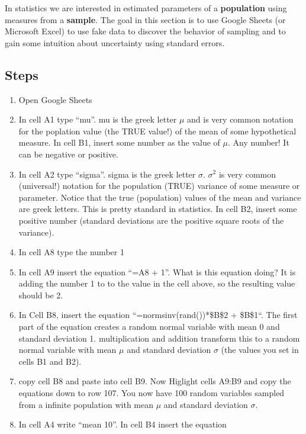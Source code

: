 \documentclass[]{book}
\providecommand{\tightlist}{%
  \setlength{\itemsep}{0pt}\setlength{\parskip}{0pt}}
\begin{document}
In statistics we are interested in estimated parameters of a
\textbf{population} using measures from a \textbf{sample}. The goal in
this section is to use Google Sheets (or Microsoft Excel) to use fake
data to discover the behavior of sampling and to gain some intuition
about uncertainty using standard errors.

\subsection{Steps}\label{steps}

\begin{enumerate}
\def\labelenumi{\arabic{enumi}.}
\tightlist
\item
  Open Google Sheets
\item
  In cell A1 type ``mu''. mu is the greek letter \(\mu\) and is very
  common notation for the poplation value (the TRUE value!) of the mean
  of some hypothetical measure. In cell B1, insert some number as the
  value of \(\mu\). Any number! It can be negative or positive.
\item
  In cell A2 type ``sigma''. sigma is the greek letter \(\sigma\).
  \(\sigma^2\) is very common (universal!) notation for the population
  (TRUE) variance of some measure or parameter. Notice that the true
  (population) values of the mean and variance are greek letters. This
  is pretty standard in statistics. In cell B2, insert some positive
  number (standard deviations are the positive square roots of the
  variance).
\item
  In cell A8 type the number 1
\item
  In cell A9 insert the equation ``=A8 + 1''. What is this equation
  doing? It is adding the number 1 to to the value in the cell above, so
  the resulting value should be 2.
\item
  In Cell B8, insert the equation ``=normsinv(rand())*\$B\$2 + \$B\$1``.
  The first part of the equation creates a random normal variable with
  mean 0 and standard deviation 1. multiplication and addition transform
  this to a random normal variable with mean \(\mu\) and standard
  deviation \(\sigma\) (the values you set in cells B1 and B2).
\item
  copy cell B8 and paste into cell B9. Now Higlight cells A9:B9 and copy
  the equations down to row 107. You now have 100 random variables
  sampled from a infinite population with mean \(\mu\) and standard
  deviation \(\sigma\).
\item
  In cell A4 write ``mean 10''. In cell B4 insert the equation

\end{enumerate}
\end{document}
